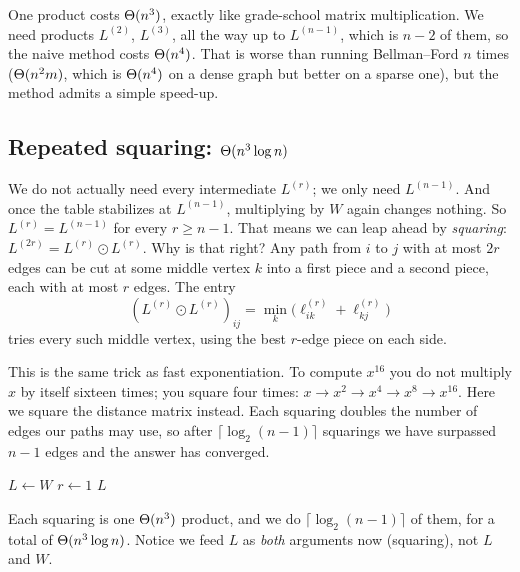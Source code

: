 One product costs $\Theta(n^3)$, exactly like grade-school matrix multiplication.
We need products $L^{(2)}$, $L^{(3)}$, all the way up to $L^{(n-1)}$, which is
$n - 2$ of them,
so the naive method costs $\Theta(n^4)$. That is worse than running Bellman--Ford
$n$ times ($\Theta(n^2 m)$, which is $\Theta(n^4)$ on a dense graph but better on a
sparse one), but the method admits a simple speed-up.

\subsection{Repeated squaring: $\Theta(n^3 \log n)$}

We do not actually need every intermediate $L^{(r)}$; we only need
$L^{(n-1)}$. And once the table stabilizes at $L^{(n-1)}$, multiplying by $W$
again changes nothing. So $L^{(r)} = L^{(n-1)}$ for every $r \ge n-1$. That
means we can leap ahead by \emph{squaring}: $L^{(2r)} = L^{(r)} \odot L^{(r)}$.
Why is that right? Any path from $i$ to $j$ with at most $2r$ edges can be cut
at some middle vertex $k$ into a first piece and a second piece, each with at
most $r$ edges. The entry
\[
(L^{(r)} \odot L^{(r)})_{ij} = \min_k \bigl(\ell^{(r)}_{ik} + \ell^{(r)}_{kj}\bigr)
\]
tries every such middle vertex, using the best $r$-edge piece on each side.

\begin{intuitionbox}
This is the same trick as fast exponentiation. To compute $x^{16}$ you do not
multiply $x$ by itself sixteen times; you square four times:
$x \to x^2 \to x^4 \to x^8 \to x^{16}$. Here we square the distance matrix
instead. Each squaring doubles the number of edges our paths may use, so after
$\lceil \log_2(n-1)\rceil$ squarings we have surpassed $n-1$ edges and the
answer has converged.
\end{intuitionbox}

\begin{algorithm}[H]
\caption{\textsc{Faster-APSP}($W$) -- min-plus repeated squaring}
$L \leftarrow W$\;
$r \leftarrow 1$\;
\Return $L$\;
\end{algorithm}

Each squaring is one $\Theta(n^3)$ product, and we do $\lceil \log_2(n-1) \rceil$
of them, for a total of $\Theta(n^3 \log n)$. Notice we feed $L$ as \emph{both}
arguments now (squaring), not $L$ and $W$.

